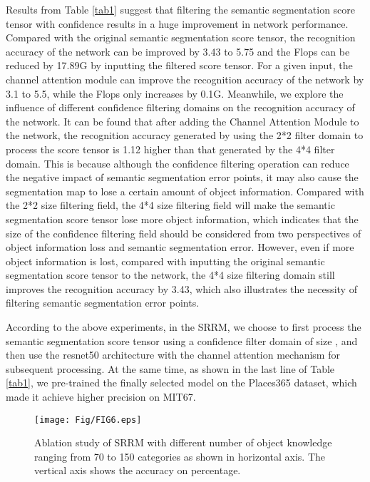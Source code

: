\documentclass[conference]{IEEEtran}
\begin{document}
Results from Table \ref{tab1} suggest that filtering the semantic segmentation score tensor with confidence results in a huge improvement in network performance. Compared with the original semantic segmentation score tensor, the recognition accuracy of the network can be improved by 3.43 to 5.75 and the Flops can be reduced by 17.89G by inputting the filtered score tensor. For a given input, the channel attention module can improve the recognition accuracy of the network by 3.1 to 5.5, while the Flops only increases by 0.1G.
Meanwhile, we explore the influence of different confidence filtering domains on the recognition accuracy of the network. It can be found that after adding the Channel Attention Module to the network, the recognition accuracy generated by using the 2*2 filter domain to process the score tensor is 1.12 higher than that generated by the 4*4 filter domain. This is because although the confidence filtering operation can reduce the negative impact of semantic segmentation error points, it may also cause the segmentation map to lose a certain amount of object information. Compared with the 2*2 size filtering field, the 4*4 size filtering field will make the semantic segmentation score tensor lose more object information, which indicates that the size of the confidence filtering field should be considered from two perspectives of object information loss and semantic segmentation error. However, even if more object information is lost, compared with inputting the original semantic segmentation score tensor to the network, the 4*4 size filtering domain still improves the recognition accuracy by 3.43, which also illustrates the necessity of filtering semantic segmentation error points.

According to the above experiments, in the SRRM, we choose to first process the semantic segmentation score tensor using a confidence filter domain of size , and then use the resnet50 architecture with the channel attention mechanism for subsequent processing. At the same time, as shown in the last line of Table \ref{tab1}, we pre-trained the finally selected model on the Places365 dataset, which made it achieve higher precision on MIT67.

\begin{figure}[htbp]
    \centering
    \texttt{[image: Fig/FIG6.eps]}
    \caption{Ablation study of SRRM with different number of object knowledge ranging from 70 to 150 categories as shown in horizontal axis. The vertical axis shows the accuracy on percentage.}
    \label{Fig6}
\end{figure}
\end{document}
